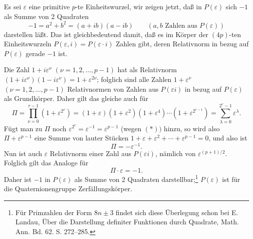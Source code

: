 Es sei $\varepsilon$ eine primitive $p$-te Einheitswurzel, wir zeigen jetzt, daß in $P(\varepsilon)$ sich $-1$ als Summe von 2 Quadraten
\[
        -1=a^2+b^2=(a+ib)(a-ib)\qquad (a,b\text{ Zahlen aus }P(\varepsilon))
\]
darstellen läßt. Das ist gleichbedeutend damit, daß es im Körper der $(4p)$-ten Einheitswurzeln $P(\varepsilon,i)=P(\varepsilon\cdot i)$ Zahlen gibt, deren Relativnorm in bezug auf $P(\varepsilon)$ gerade $-1$ ist.

Die Zahl $1+i\varepsilon^\nu$ $(\nu=1,2,\ldots,p-1)$ hat als Relativnorm $(1+i\varepsilon^\nu)(1-i\varepsilon^\nu)=1+\varepsilon^{2\nu}$; folglich sind alle Zahlen $1+\varepsilon^\nu$ $(\nu=1,2,\ldots,p-1)$ Relativnormen von Zahlen aus $P(\varepsilon i)$ in bezug auf $P(\varepsilon)$ als Grundkörper. Daher gilt das gleiche auch für
\[
\Pi=\prod_{\nu=0}^{r-1}(1+\varepsilon^{2^\nu})
=(1+\varepsilon)(1+\varepsilon^2)(1+\varepsilon^4)\cdots(1+\varepsilon^{2^{r-1}})
=\sum_{\lambda=0}^{2^r-1}\varepsilon^\lambda.
\]
Fügt man zu $\Pi$ noch $\varepsilon^{2^r}=\varepsilon^{-1}=\varepsilon^{p-1}$ (wegen $(*))$ hinzu, so wird also $\Pi+\varepsilon^{p-1}$ eine Summe von lauter Stücken $1+\varepsilon+\varepsilon^2+\cdots+\varepsilon^{p-1}=0$, und also ist
\[
        \Pi=-\varepsilon^{-1}.
\]
Nun ist auch $\varepsilon$ Relativnorm einer Zahl aus $P(\varepsilon i)$, nämlich von $\varepsilon^{(p+1)/2}$. Folglich gilt das Analoge für
\[
        \Pi\cdot\varepsilon=-1.
\]
Daher ist $-1$ in $P(\varepsilon)$ als Summe von 2 Quadraten darstellbar;\footnote{Für Primzahlen der Form $8n\pm3$ findet sich diese Überlegung schon bei E. Landau, Über die Darstellung definiter Funktionen durch Quadrate, Math. Ann. Bd. 62. S. 272--285.} $P(\varepsilon)$ ist für die Quaternionengruppe Zerfällungskörper.
